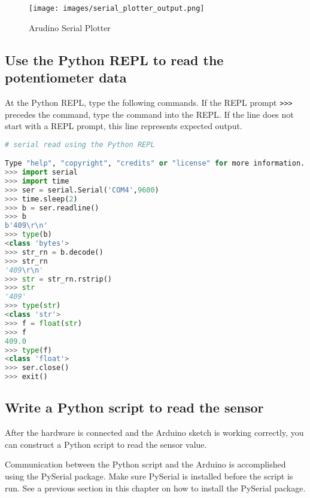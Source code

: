 \documentclass{book}
\makeatletter
\def\maxwidth{\ifdim\Gin@nat@width>\linewidth\linewidth
\else\Gin@nat@width\fi}
\let\Oldincludegraphics\includegraphics
\renewcommand{\includegraphics}[1]{\Oldincludegraphics[width=.8\maxwidth]{#1}}
\newcommand{\passthrough}[1]{#1}
\makeatother
\begin{document}
\begin{figure}
\centering
\texttt{[image: images/serial\_plotter\_output.png]}
\caption{Arudino Serial Plotter}
\end{figure}
    




    
        \hypertarget{use-the-python-repl-to-read-the-potentiometer-data}{%
\subsection{Use the Python REPL to read the potentiometer
data}\label{use-the-python-repl-to-read-the-potentiometer-data}}

At the Python REPL, type the following commands. If the REPL prompt
\passthrough{\lstinline!>>>!} precedes the command, type the command
into the REPL. If the line does not start with a REPL prompt, this line
represents expected output.

\begin{lstlisting}[language=Python]
# serial read using the Python REPL

Type "help", "copyright", "credits" or "license" for more information.
>>> import serial
>>> import time
>>> ser = serial.Serial('COM4',9600)
>>> time.sleep(2)
>>> b = ser.readline()
>>> b
b'409\r\n'
>>> type(b)
<class 'bytes'>
>>> str_rn = b.decode()
>>> str_rn
'409\r\n'
>>> str = str_rn.rstrip()
>>> str
'409'
>>> type(str)
<class 'str'>
>>> f = float(str)
>>> f
409.0
>>> type(f)
<class 'float'>
>>> ser.close()
>>> exit()
\end{lstlisting}
    




    
        \hypertarget{write-a-python-script-to-read-the-sensor}{%
\subsection{Write a Python script to read the
sensor}\label{write-a-python-script-to-read-the-sensor}}
    




    
        After the hardware is connected and the Arduino sketch is working
correctly, you can construct a Python script to read the sensor value.

Communication between the Python script and the Arduino is accomplished
using the PySerial package. Make sure PySerial is installed before the
script is run. See a previous section in this chapter on how to install
the PySerial package.
\end{document}

